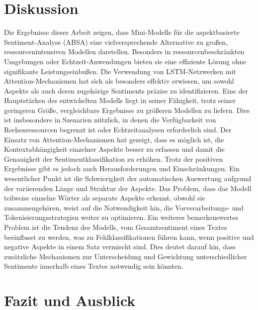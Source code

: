 \documentclass[12pt]{article}
\begin{document}
\section{Diskussion}

Die Ergebnisse dieser Arbeit zeigen, dass Mini-Modelle für die aspektbasierte Sentiment-Analyse (ABSA) eine vielversprechende Alternative zu großen, ressourcenintensiven Modellen darstellen. Besonders in ressourcenbeschränkten Umgebungen oder Echtzeit-Anwendungen bieten sie eine effiziente Lösung ohne signifikante Leistungseinbußen. Die Verwendung von LSTM-Netzwerken mit Attention-Mechanismen hat sich als besonders effektiv erwiesen, um sowohl Aspekte als auch deren zugehörige Sentiments präzise zu identifizieren.
\newline
\newline
Eine der Hauptstärken des entwickelten Modells liegt in seiner Fähigkeit, trotz seiner geringeren Größe, vergleichbare Ergebnisse zu größeren Modellen zu liefern. Dies ist insbesondere in Szenarien nützlich, in denen die Verfügbarkeit von Rechenressourcen begrenzt ist oder Echtzeitanalysen erforderlich sind. Der Einsatz von Attention-Mechanismen hat gezeigt, dass es möglich ist, die Kontextabhängigkeit einzelner Aspekte besser zu erfassen und damit die Genauigkeit der Sentimentklassifikation zu erhöhen.
\newline
\newline
Trotz der positiven Ergebnisse gibt es jedoch auch Herausforderungen und Einschränkungen. Ein wesentlicher Punkt ist die Schwierigkeit der automatischen Auswertung aufgrund der variierenden Länge und Struktur der Aspekte. Das Problem, dass das Modell teilweise einzelne Wörter als separate Aspekte erkennt, obwohl sie zusammengehören, weist auf die Notwendigkeit hin, die Vorverarbeitungs- und Tokenisierungsstrategien weiter zu optimieren.
Ein weiteres bemerkenswertes Problem ist die Tendenz des Modells, vom Gesamtsentiment eines Textes beeinflusst zu werden, was zu Fehlklassifikationen führen kann, wenn positive und negative Aspekte in einem Satz vermischt sind. Dies deutet darauf hin, dass zusätzliche Mechanismen zur Unterscheidung und Gewichtung unterschiedlicher Sentimente innerhalb eines Textes notwendig sein könnten.

\section{Fazit und Ausblick}
\end{document}
